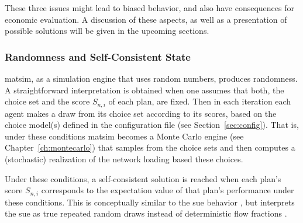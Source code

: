 %
These three issues might lead to biased behavior, and also have consequences for economic evaluation. A discussion of these aspects, as well as a presentation of possible solutions will be given in the upcoming sections.


\subsubsection{Randomness and Self-Consistent State}
\label{ch:economicEval:describingBehavior:discreteChoice:quenchedVsAnnealed}
%
%


\acrshort{matsim}, as a simulation engine that uses random numbers, produces randomness.
%
A straightforward interpretation is obtained when one assumes that both, the choice set and the score $S_{n,i}$ of each plan, 
%
%
are fixed. Then in each iteration each agent makes a draw from its choice set according to its scores, based on the choice model(s) defined in the configuration file (see Section~\ref{sec:config}).
%
%
%
That is, under these conditions \acrshort{matsim} becomes a Monte Carlo engine
%
(see Chapter~\ref{ch:montecarlo})
%
%
%
that samples from the choice sets and then computes a (stochastic) realization of the network loading based these choices.

Under these conditions, a self-consistent solution is reached when each plan's score $S_{n,i}$ corresponds to the expectation value of that plan's performance under these conditions.
%
%
%
This is conceptually similar to the \gls{sue} behavior \citep{DaganzoSheffi1977SUE}, but interprets the \gls{sue} as true repeated random draws instead of deterministic flow fractions \citep{NagelFloetteroed2009IatbrResourceInBook}.

